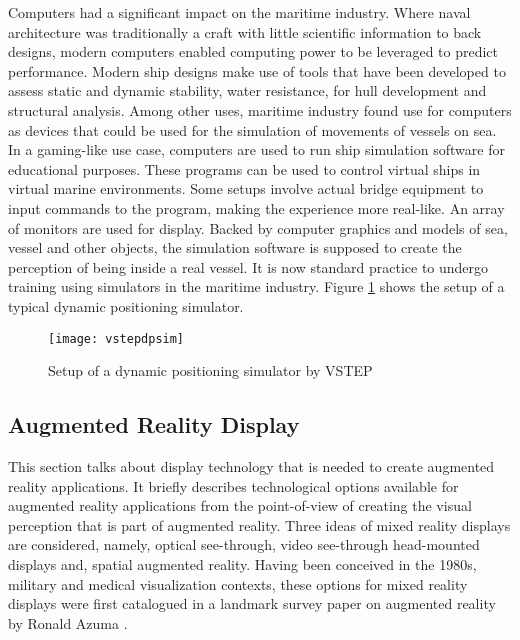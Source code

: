 Computers had a significant impact on the maritime industry. Where naval architecture was traditionally a craft with little scientific information to back designs, modern computers enabled computing power to be leveraged to predict performance. Modern ship designs make use of tools that have been developed to assess static and dynamic stability, water resistance, for hull development and structural analysis. Among other uses, maritime industry found use for computers as devices that could be used for the simulation of movements of vessels on sea. In a gaming-like use case, computers are used to run ship simulation software for educational purposes. These programs can be used to control virtual ships in virtual marine environments. Some setups involve actual bridge equipment to input commands to the program, making the experience more real-like. An array of monitors are used for display. Backed by computer graphics and models of sea, vessel and other objects, the simulation software is supposed to create the perception of being inside a real vessel. It is now standard practice to undergo training using simulators in the maritime industry. Figure \ref{fig:vstepdpsim} shows the setup of a typical dynamic positioning simulator. 


\begin{figure}
	\centering
	\texttt{[image: vstepdpsim]}
	\caption{Setup of a dynamic positioning simulator by VSTEP}
	\label{fig:vstepdpsim}
\end{figure}


\subsection{Augmented Reality Display}
This section talks about display technology that is needed to create augmented reality applications.%
It briefly describes technological options available for augmented reality applications from the point-of-view of creating the visual perception that is part of augmented reality. Three ideas of mixed reality displays are considered, namely, optical see-through, video see-through head-mounted displays and, spatial augmented reality. Having been conceived in the 1980s, military and medical visualization contexts, these options for mixed reality displays were first catalogued in a landmark survey paper on augmented reality by Ronald Azuma \cite{azuma1997survey}. 

